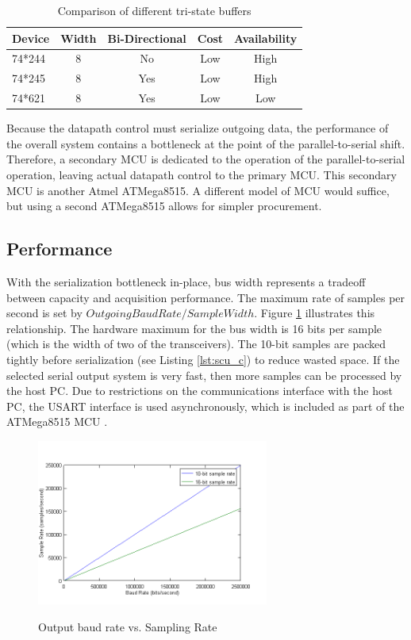 \begin{table}[bhp]
\caption[Buffer Comparison]{Comparison of different tri-state buffers}
\small
\begin{center}
\begin{tabular}{l| c c c c}
\setlength{\tabcolsep}{1pt}
	Device & Width & Bi-Directional & Cost & Availability \\\hline
	74*244 & 8     & No             & Low  & High\\
	74*245 & 8     & Yes            & Low  & High\\
	74*621 & 8     & Yes            & Low  & Low
\end{tabular}
\end{center}
\label{tab:buffer comparison}
\end{table}

Because the datapath control must serialize outgoing data, the performance
of the overall system contains a bottleneck at the point of the 
parallel-to-serial shift. Therefore, a secondary MCU is dedicated to
the operation of the parallel-to-serial operation, leaving actual datapath 
control to the primary MCU. This secondary MCU is another Atmel ATMega8515. A
different model of MCU would suffice, but using a second ATMega8515 allows  
for simpler procurement.

\subsection{Performance}
With the serialization bottleneck in-place, bus width represents a tradeoff 
between capacity and acquisition performance. The maximum rate of samples per
second is set by ${Outgoing Baud Rate}/{Sample Width}$. Figure \ref{fig:baud rates and sample} 
illustrates this relationship. The hardware maximum for the bus width is 16 bits
per sample (which is the width of two of the transceivers). The 10-bit samples
are packed tightly before serialization (see Listing \ref{lst:scu_c}) to reduce
 wasted space. If the selected serial output system is very fast, then more 
samples can be processed by the host PC. Due to restrictions on the 
communications interface with the host PC, the USART  interface 
is used asynchronously, which is included as part of the ATMega8515 MCU
\cite{ds:ATMEGA8515}.

\begin{figure}[hbp]
\caption[Baud Rate and Samples]{Output baud rate vs. Sampling Rate\cite{ds:ATMEGA8515}}
\includegraphics[width=3in]{baud_rate.png}
\label{fig:baud rates and sample}
\end{figure}
